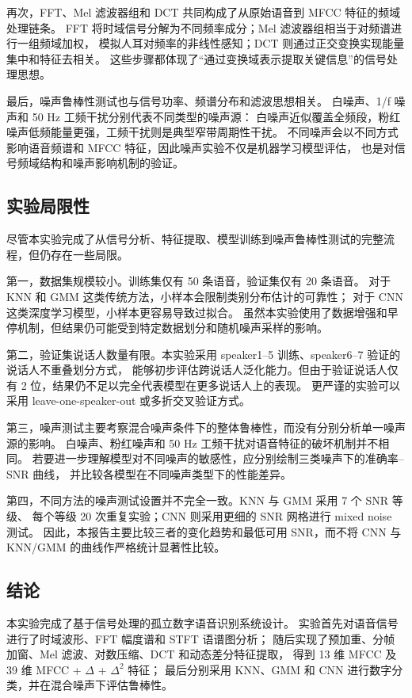 再次，FFT、Mel 滤波器组和 DCT 共同构成了从原始语音到 MFCC 特征的频域处理链条。
FFT 将时域信号分解为不同频率成分；Mel 滤波器组相当于对频谱进行一组频域加权，
模拟人耳对频率的非线性感知；DCT 则通过正交变换实现能量集中和特征去相关。
这些步骤都体现了“通过变换域表示提取关键信息”的信号处理思想。

最后，噪声鲁棒性测试也与信号功率、频谱分布和滤波思想相关。
白噪声、1/f 噪声和 50 Hz 工频干扰分别代表不同类型的噪声源：
白噪声近似覆盖全频段，粉红噪声低频能量更强，工频干扰则是典型窄带周期性干扰。
不同噪声会以不同方式影响语音频谱和 MFCC 特征，因此噪声实验不仅是机器学习模型评估，
也是对信号频域结构和噪声影响机制的验证。

\subsection{实验局限性}

尽管本实验完成了从信号分析、特征提取、模型训练到噪声鲁棒性测试的完整流程，但仍存在一些局限。

第一，数据集规模较小。训练集仅有 50 条语音，验证集仅有 20 条语音。
对于 KNN 和 GMM 这类传统方法，小样本会限制类别分布估计的可靠性；
对于 CNN 这类深度学习模型，小样本更容易导致过拟合。
虽然本实验使用了数据增强和早停机制，但结果仍可能受到特定数据划分和随机噪声采样的影响。

第二，验证集说话人数量有限。本实验采用 speaker1--5 训练、speaker6--7 验证的说话人不重叠划分方式，
能够初步评估跨说话人泛化能力。但由于验证说话人仅有 2 位，结果仍不足以完全代表模型在更多说话人上的表现。
更严谨的实验可以采用 leave-one-speaker-out 或多折交叉验证方式。

第三，噪声测试主要考察混合噪声条件下的整体鲁棒性，而没有分别分析单一噪声源的影响。
白噪声、粉红噪声和 50 Hz 工频干扰对语音特征的破坏机制并不相同。
若要进一步理解模型对不同噪声的敏感性，应分别绘制三类噪声下的准确率--SNR 曲线，
并比较各模型在不同噪声类型下的性能差异。

第四，不同方法的噪声测试设置并不完全一致。KNN 与 GMM 采用 7 个 SNR 等级、
每个等级 20 次重复实验；CNN 则采用更细的 SNR 网格进行 mixed noise 测试。
因此，本报告主要比较三者的变化趋势和最低可用 SNR，而不将 CNN 与 KNN/GMM 的曲线作严格统计显著性比较。

\subsection{结论}

本实验完成了基于信号处理的孤立数字语音识别系统设计。
实验首先对语音信号进行了时域波形、FFT 幅度谱和 STFT 语谱图分析；
随后实现了预加重、分帧加窗、Mel 滤波、对数压缩、DCT 和动态差分特征提取，
得到 13 维 MFCC 及 39 维 MFCC + $\Delta$ + $\Delta^2$ 特征；
最后分别采用 KNN、GMM 和 CNN 进行数字分类，并在混合噪声下评估鲁棒性。

